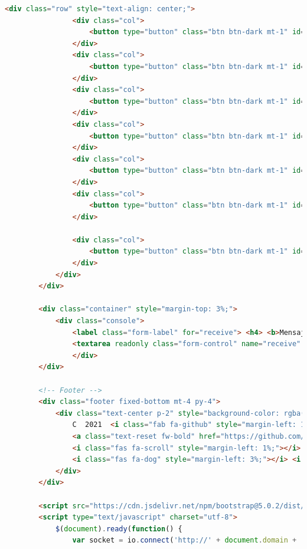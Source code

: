 \documentclass[12pt]{article}
\begin{document}
\begin{lstlisting}[language=html]
			<div class="row" style="text-align: center;">
				<div class="col">
					<button type="button" class="btn btn-dark mt-1" id="send_ping" value="ping"><i class="fas fa-comments"></i>  Comprobar actividad</button>
				</div>
				<div class="col">
					<button type="button" class="btn btn-dark mt-1" id="send_status" value="status"><i class="fas fa-clipboard-list"></i>  Comprobar estado</button>
				</div>
				<div class="col">
					<button type="button" class="btn btn-dark mt-1" id="send_check_levels" value="check_levels"> <i class="far fa-check-circle"></i>  Comprobar niveles</button>
				</div>
				<div class="col">
					<button type="button" class="btn btn-dark mt-1" id="send_comedero" value="rellenar_comedero"><i class="fas fa-utensils"></i> Rellenar comedero</button>
				</div>
				<div class="col">
					<button type="button" class="btn btn-dark mt-1" id="send_reset_comedero" value="reset_comedero"><i class="fas fa-eraser"></i> Reiniciar comedero</button>
				</div>
				<div class="col">
					<button type="button" class="btn btn-dark mt-1" id="send_bebedero" value="rellenar_bebedero"><i class="fas fa-faucet"></i> Rellenar bebedero</button>
				</div>
				
				<div class="col">
					<button type="button" class="btn btn-dark mt-1" id="send_oled" value="update_oled"><i class="fas fa-desktop"></i> Actualizar pantalla</button>
				</div>
			</div>
		</div>
				
		<div class="container" style="margin-top: 3%;">
			<div class="console">
				<label class="form-label" for="receive"> <h4> <b>Mensajes recibidos:</b> </h4>  </label>
				<textarea readonly class="form-control" name="receive" id="receive" rows="8" style="width: 100%; height: auto;"></textarea>
				</div>
		</div>
				
		<!-- Footer -->
		<div class="footer fixed-bottom mt-4 py-4">
			<div class="text-center p-2" style="background-color: rgba(0, 0, 0, 0.05); margin-bottom: -1%;">
				C  2021  <i class="fab fa-github" style="margin-left: 1%;"></i> Github:
				<a class="text-reset fw-bold" href="https://github.com/ChiaFranfer">ChiaFranfer</a> 
				<i class="fas fa-scroll" style="margin-left: 1%;"></i> Documentacion: <a class="text-reset fw-bold" href="{{url_for('doc')}}"> Ir a documentacion</a>
				<i class="fas fa-dog" style="margin-left: 3%;"></i> <i class="fas fa-cat"></i> <i class="fas fa-heart"></i>
			</div>
		</div>
				
		<script src="https://cdn.jsdelivr.net/npm/bootstrap@5.0.2/dist/js/bootstrap.bundle.min.js" integrity="sha384-MrcW6ZMFYlzcLA8Nl+NtUVF0sA7MsXsP1UyJoMp4YLEuNSfAP+JcXn/tWtIaxVXM" crossorigin="anonymous"></script>
		<script type="text/javascript" charset="utf-8">
			$(document).ready(function() {
				var socket = io.connect('http://' + document.domain + ':' + location.port);
					

\end{lstlisting}
\end{document}
